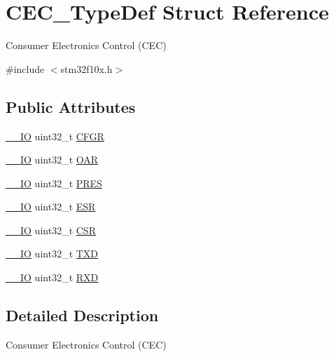 \hypertarget{struct_c_e_c___type_def}{}\section{C\+E\+C\+\_\+\+Type\+Def Struct Reference}
\label{struct_c_e_c___type_def}


Consumer Electronics Control (C\+EC)  




{\ttfamily \#include $<$stm32f10x.\+h$>$}

\subsection*{Public Attributes}
\begin{DoxyCompactItemize}
\item 
\hyperlink{core__sc300_8h_aec43007d9998a0a0e01faede4133d6be}{\+\_\+\+\_\+\+IO} uint32\+\_\+t \hyperlink{struct_c_e_c___type_def_a91a55cd277c20e5c5ad228fd9013d014}{C\+F\+GR}
\item 
\hyperlink{core__sc300_8h_aec43007d9998a0a0e01faede4133d6be}{\+\_\+\+\_\+\+IO} uint32\+\_\+t \hyperlink{struct_c_e_c___type_def_aa578935e8a0795a0a7494f4d281bc43d}{O\+AR}
\item 
\hyperlink{core__sc300_8h_aec43007d9998a0a0e01faede4133d6be}{\+\_\+\+\_\+\+IO} uint32\+\_\+t \hyperlink{struct_c_e_c___type_def_a2e1d5865f3d49a195e58f265b425256e}{P\+R\+ES}
\item 
\hyperlink{core__sc300_8h_aec43007d9998a0a0e01faede4133d6be}{\+\_\+\+\_\+\+IO} uint32\+\_\+t \hyperlink{struct_c_e_c___type_def_a90adcbf5ee626747170b2f208770628f}{E\+SR}
\item 
\hyperlink{core__sc300_8h_aec43007d9998a0a0e01faede4133d6be}{\+\_\+\+\_\+\+IO} uint32\+\_\+t \hyperlink{struct_c_e_c___type_def_ad9aa13645f701c5457fbf51a9ecf7aa4}{C\+SR}
\item 
\hyperlink{core__sc300_8h_aec43007d9998a0a0e01faede4133d6be}{\+\_\+\+\_\+\+IO} uint32\+\_\+t \hyperlink{struct_c_e_c___type_def_a462a952588fc45732d4545dbe79356da}{T\+XD}
\item 
\hyperlink{core__sc300_8h_aec43007d9998a0a0e01faede4133d6be}{\+\_\+\+\_\+\+IO} uint32\+\_\+t \hyperlink{struct_c_e_c___type_def_a13d5b0e5228d5cca9f7c5d8533705d21}{R\+XD}
\end{DoxyCompactItemize}


\subsection{Detailed Description}
Consumer Electronics Control (C\+EC) 


